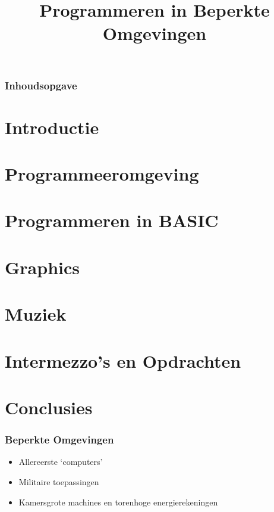 \documentclass[aspectratio=43]{uva-inf-presentation}
\title{Programmeren in Beperkte Omgevingen}
\begin{document}
\begin{titelframe}
\titlepage

\end{titelframe}

\begin{frame}[noframenumbering]
\frametitle{Inhoudsopgave}
\tableofcontents
\end{frame}

\section{Introductie}
\section{Programmeeromgeving}
\section{Programmeren in BASIC}
\section{Graphics}
\section{Muziek}
\section{Intermezzo's en Opdrachten}

\section{Conclusies}


\begin{frame}[noframenumbering]
\frametitle{Beperkte Omgevingen}

\begin{itemize}
\item Allereerste `computers'
\item Militaire toepassingen
\item Kamersgrote machines en torenhoge energierekeningen
\end{itemize}

\end{frame}

\end{document}
